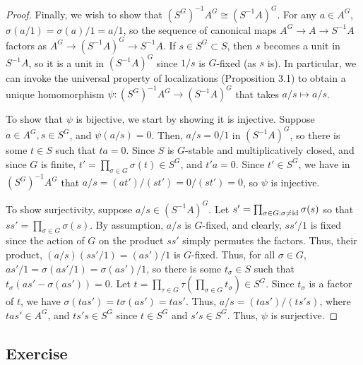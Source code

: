 \begin{proof}
Finally, we wish to show that $(S^G)^{-1}A^G \cong (S^{-1}A)^G$. For any $a \in A^G$, $\sigma(a/1) = \sigma(a)/1 = a/1$, so the sequence of
canonical maps $A^G \to A \to S^{-1}A$ factors as $A^G \to (S^{-1}A)^G \to S^{-1}A$. If $s \in S^G \subset S$, then $s$ becomes a unit in 
$S^{-1}A$, so it is a unit in $(S^{-1}A)^G$ since $1/s$ is $G$-fixed (as $s$ is). In particular, we can invoke the universal property of
localizations (Proposition 3.1) to obtain a unique homomorphism $\psi : (S^G)^{-1}A^G \to (S^{-1}A)^G$ that takes $a/s \mapsto a/s$.

To show that $\psi$ is bijective, we start by showing it is injective. Suppose $a \in A^G, s \in S^G$, and $\psi(a/s) = 0$. Then, $a/s = 0/1$ in 
$(S^{-1}A)^G$, so there is some $t \in S$ such that $ta = 0$. Since $S$ is $G$-stable and multiplicatively closed, and since $G$ is finite, 
$t' = \prod_{\sigma \in G}\sigma(t) \in S^G$, and $t'a = 0$. Since $t' \in S^G$, we have in $(S^G)^{-1}A^G$ that $a/s = (at')/(st') = 0/(st') = 0$,
so $\psi$ is injective.

To show surjectivity, suppose $a/s \in (S^{-1}A)^G$. Let $s' = \prod_{\sigma \in G : \sigma \neq \operatorname{id}} \sigma(s)$ so that $ss' = \prod_{\sigma \in G} \sigma(s)$.
By assumption, $a/s$ is $G$-fixed, and clearly, $ss'/1$ is fixed since the action of $G$ on the product $ss'$ simply permutes the factors. Thus, their product,
$(a/s)(ss'/1) = (as')/1$ is $G$-fixed. Thus, for all $\sigma \in G$, $as'/1 = \sigma(as'/1) = \sigma(as')/1$, so there is some $t_{\sigma} \in S$ such that
$t_{\sigma}(as' - \sigma(as')) = 0$. Let $t = \prod_{\tau \in G}\tau\left(\prod_{\sigma \in G}t_{\sigma}\right) \in S^G$. Since $t_{\sigma}$ is a factor of $t$,
we have $\sigma(t a s') = t \sigma(a s') = t a s'$. Thus, $a/s = (t a s')/(t s' s)$, where $tas' \in A^G$, and $t s' s \in S^G$ since $t \in S^G$ and 
$s' s \in S^G$. Thus, $\psi$ is surjective.
\end{proof}

\subsection{Exercise}\label{5.13}

